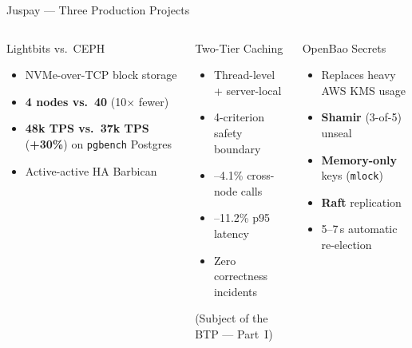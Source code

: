 \documentclass[aspectratio=169,xcolor=dvipsnames,9pt]{beamer}
\begin{document}
\begin{frame}{Juspay --- Three Production Projects}
\begin{columns}[T]
  \begin{block}{Lightbits vs.\ CEPH}
    \footnotesize
    \begin{itemize}
      \item NVMe-over-TCP block storage
      \item \textbf{4 nodes vs.\ 40} (10$\times$ fewer)
      \item \textbf{48k TPS vs.\ 37k TPS} (\textbf{+30\%}) on \texttt{pgbench} Postgres
      \item Active-active HA Barbican
    \end{itemize}
  \end{block}
  \begin{exampleblock}{Two-Tier Caching}
    \footnotesize
    \begin{itemize}
      \item Thread-level + server-local
      \item 4-criterion safety boundary
      \item --4.1\% cross-node calls
      \item --11.2\% p95 latency
      \item Zero correctness incidents
    \end{itemize}
    (Subject of the BTP --- Part~I)
  \end{exampleblock}
  \begin{alertblock}{OpenBao Secrets}
    \footnotesize
    \begin{itemize}
      \item Replaces heavy AWS KMS usage
      \item \textbf{Shamir} (3-of-5) unseal
      \item \textbf{Memory-only} keys (\texttt{mlock})
      \item \textbf{Raft} replication
      \item 5--7\,s automatic re-election
    \end{itemize}
  \end{alertblock}
\end{columns}
\end{frame}
\end{document}
